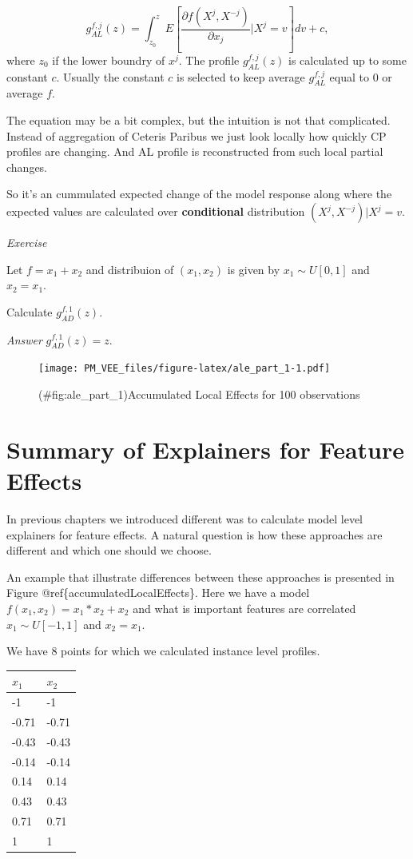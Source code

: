 \documentclass[12pt,]{krantz}
\theoremstyle{definition}
\theoremstyle{definition}
\theoremstyle{definition}
\theoremstyle{remark}
\begin{document}
\[
g_{AL}^{f, j}(z) = \int_{z_0}^z E\left[\frac{\partial f(X^j, X^{-j})}{\partial x_j}|X^j = v\right] dv + c,
\] where \(z_0\) if the lower boundry of \(x^j\). The profile
\(g_{AL}^{f, j}(z)\) is calculated up to some constant \(c\). Usually
the constant \(c\) is selected to keep average \(g_{AL}^{f, j}\) equal
to 0 or average \(f\).

The equation may be a bit complex, but the intuition is not that
complicated. Instead of aggregation of Ceteris Paribus we just look
locally how quickly CP profiles are changing. And AL profile is
reconstructed from such local partial changes.

So it's an cummulated expected change of the model response along where
the expected values are calculated over \textbf{conditional}
distribution \((X^j,X^{-j})|X^j=v\).

\emph{Exercise}

Let \(f = x_1 + x_2\) and distribuion of \((x_1, x_2)\) is given by
\(x_1 \sim U[0,1]\) and \(x_2=x_1\).

Calculate \(g_{AD}^{f, 1}(z)\).

\emph{Answer} \(g_{AD}^{f, 1}(z) = z\).

\begin{figure}
\centering
\texttt{[image: PM\_VEE\_files/figure-latex/ale\_part\_1-1.pdf]}
\caption{(\#fig:ale\_part\_1)Accumulated Local Effects for 100
observations}
\end{figure}

\hypertarget{summaryFeatureEffects}{%
\section{Summary of Explainers for Feature
Effects}\label{summaryFeatureEffects}}

In previous chapters we introduced different was to calculate model
level explainers for feature effects. A natural question is how these
approaches are different and which one should we choose.

An example that illustrate differences between these approaches is
presented in Figure @ref\{accumulatedLocalEffects\}. Here we have a
model \(f(x_1, x_2) = x_1*x_2 + x_2\) and what is important features are
correlated \(x_1 \sim U[-1,1]\) and \(x_2 = x_1\).

We have 8 points for which we calculated instance level profiles.

\begin{longtable}[]{@{}ll@{}}
\toprule
\(x_1\) & \(x_2\)\tabularnewline
\midrule
\endhead
-1 & -1\tabularnewline
-0.71 & -0.71\tabularnewline
-0.43 & -0.43\tabularnewline
-0.14 & -0.14\tabularnewline
0.14 & 0.14\tabularnewline
0.43 & 0.43\tabularnewline
0.71 & 0.71\tabularnewline
1 & 1\tabularnewline
\bottomrule
\end{longtable}
\end{document}
